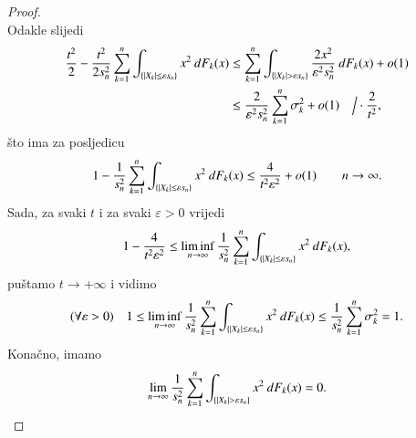 \begin{proof}
\begin{equation*}
    \end{equation*}
    Odakle slijedi
    \begin{equation*}
        \begin{aligned}
            \frac{t^2}{2} - \frac{t^2}{2 s_n^2} \sum\limits_{k = 1}^{n} \int_{\{ |X_k| \leq \varepsilon s_n \}} x^2 \: d F_k (x) &\leq \sum\limits_{k = 1}^{n} \int_{\{ |X_k| > \varepsilon s_n \}} \frac{2 x^2}{\varepsilon^2 s_n^2} \: d F_k (x) + o(1)\\
            &\leq \frac{2}{\varepsilon^2 s_n^2} \sum\limits_{k = 1}^{n} \sigma_k^2 + o (1) \quad \Big/ \cdot \frac{2}{t^2},
        \end{aligned}
    \end{equation*}
    \v sto ima za posljedicu
    \begin{equation*}
        1 - \frac{1}{s_n^2} \sum\limits_{k = 1}^{n} \int_{\{ |X_k| \leq \varepsilon s_n \}} x^2 \: d F_k (x) \leq \frac{4}{t^2 \varepsilon^2} + o(1) \quad \quad n \to \infty.
    \end{equation*}
    Sada, za svaki $t$ i za svaki $\varepsilon > 0$ vrijedi
    \begin{equation*}
        1 - \frac{4}{t^2 \varepsilon^2} \leq \liminf_{n \to \infty} \frac{1}{s_n^2} \sum\limits_{k = 1}^{n} \int_{\{ |X_k| \leq \varepsilon s_n \}} x^2 \: d F_k (x),
    \end{equation*}
    pu\v stamo $t \to +\infty$ i vidimo
    \begin{equation*}
        (\forall \varepsilon > 0) \quad 1 \leq \liminf\limits_{n \to \infty} \frac{1}{s_n^2} \sum\limits_{k = 1}^{n} \int_{\{ |X_k| \leq \varepsilon s_n \}} x^2 \: d F_k (x) \leq \frac{1}{s_n^2} \sum\limits_{k = 1}^{n} \sigma_k^2 = 1.
    \end{equation*}
    Kona\v cno, imamo
    \begin{equation*}
        \lim\limits_{n \to \infty} \frac{1}{s_n^2} \sum\limits_{k = 1}^{n} \int_{\{ |X_k| > \varepsilon s_n \}} x^2 \: d F_k (x) = 0.
    \end{equation*}
\end{proof}

\begin{kor}  \label{kor:19.13}
    
\end{kor}